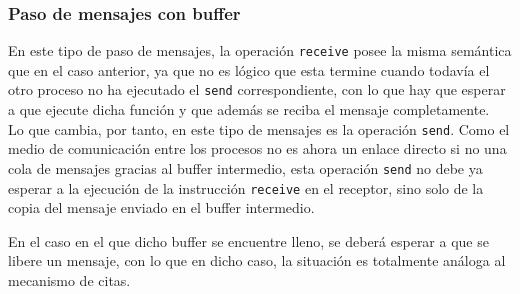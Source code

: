 \subsubsection{Paso de mensajes con buffer}
En este tipo de paso de mensajes, la operación \verb|receive| posee la misma semántica que en el caso anterior, ya que no es lógico que esta termine cuando todavía el otro proceso no ha ejecutado el \verb|send| correspondiente, con lo que hay que esperar a que ejecute dicha función y que además se reciba el mensaje completamente.\\

Lo que cambia, por tanto, en este tipo de mensajes es la operación \verb|send|. Como el medio de comunicación entre los procesos no es ahora un enlace directo si no una cola de mensajes gracias al buffer intermedio, esta operación \verb|send| no debe ya esperar a la ejecución de la instrucción \verb|receive| en el receptor, sino solo de la copia del mensaje enviado en el buffer intermedio.

En el caso en el que dicho buffer se encuentre lleno, se deberá esperar a que se libere un mensaje, con lo que en dicho caso, la situación es totalmente análoga al mecanismo de citas.\\

